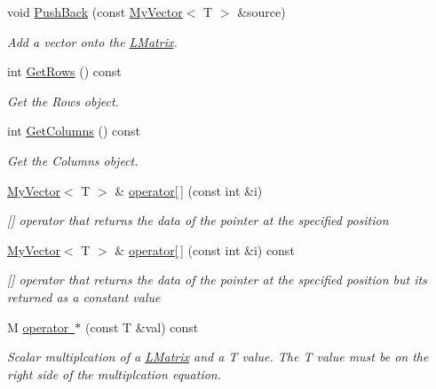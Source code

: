 \begin{DoxyCompactItemize}
void \mbox{\hyperlink{class_matrix_controller_a5f5411f7f84c53bb02b4f4febb3c4089}{Push\+Back}} (const \mbox{\hyperlink{class_my_vector}{My\+Vector}}$<$ T $>$ \&source)
\begin{DoxyCompactList}\small\item\em Add a vector onto the \mbox{\hyperlink{class_l_matrix}{L\+Matrix}}. \end{DoxyCompactList}\item 
int \mbox{\hyperlink{class_matrix_controller_a3cf741ea77589aae6557b691f4e4c3bb}{Get\+Rows}} () const
\begin{DoxyCompactList}\small\item\em Get the Rows object. \end{DoxyCompactList}\item 
int \mbox{\hyperlink{class_matrix_controller_a2d895a5b210bfc295308f97084e78002}{Get\+Columns}} () const
\begin{DoxyCompactList}\small\item\em Get the Columns object. \end{DoxyCompactList}\item 
\mbox{\hyperlink{class_my_vector}{My\+Vector}}$<$ T $>$ \& \mbox{\hyperlink{class_matrix_controller_a944709b73c0cf4d0b962eb26840a896a}{operator\mbox{[}$\,$\mbox{]}}} (const int \&i)
\begin{DoxyCompactList}\small\item\em \mbox{[}\mbox{]} operator that returns the data of the pointer at the specified position \end{DoxyCompactList}\item 
\mbox{\hyperlink{class_my_vector}{My\+Vector}}$<$ T $>$ \& \mbox{\hyperlink{class_matrix_controller_a59cfd6e10abd1a90fa0a1090bb4de240}{operator\mbox{[}$\,$\mbox{]}}} (const int \&i) const
\begin{DoxyCompactList}\small\item\em \mbox{[}\mbox{]} operator that returns the data of the pointer at the specified position but its returned as a constant value \end{DoxyCompactList}\item 
M \mbox{\hyperlink{class_matrix_controller_abe35dc2b5a0ce975799995097486893e}{operator $\ast$}} (const T \&val) const
\begin{DoxyCompactList}\small\item\em Scalar multiplcation of a \mbox{\hyperlink{class_l_matrix}{L\+Matrix}} and a T value. The T value must be on the right side of the multiplcation equation. \end{DoxyCompactList}\item 

\end{DoxyCompactItemize}
